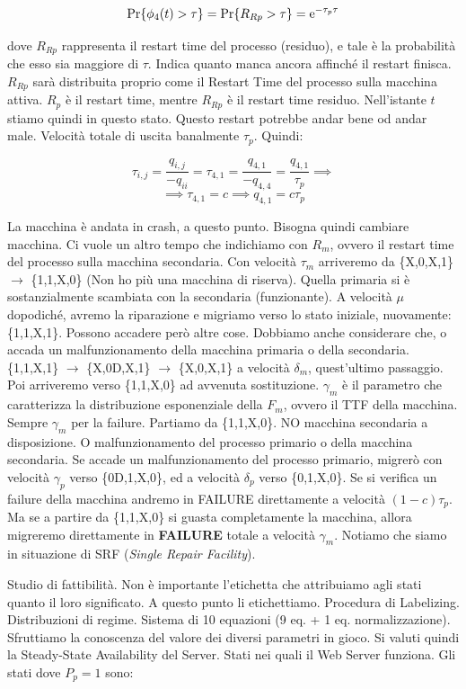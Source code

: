 \[
	\Pr\{\phi_4(t) > \tau\} = \Pr\{R_{Rp} > \tau\} = \mathop{}\!\mathrm{e}^{-\tau_p\tau}
\]

dove $R_{Rp}$ rappresenta il restart time del processo (residuo), e tale è la probabilità che esso sia maggiore di $\tau$. Indica quanto manca ancora affinché il restart finisca. $R_{Rp}$ sarà distribuita proprio come il Restart Time del processo sulla macchina attiva. $R_p$ è il restart time, mentre $R_{Rp}$ è il restart time residuo. Nell'istante $t$ stiamo quindi in questo stato. Questo restart potrebbe andar bene od andar male. Velocità totale di uscita banalmente $\tau_p$. Quindi:

\[
	\tau_{i,j} = \frac{q_{i,j}}{-q_{ii}} = \tau_{4,1} = \frac{q_{4,1}}{-q_{4,4}} = \frac{q_{4,1}}{\tau_p} \implies
\]
\[
	\implies \tau_{4,1} = c \implies q_{4,1}=c\tau_p
\]

La macchina è andata in crash, a questo punto. Bisogna quindi cambiare macchina. Ci vuole un altro tempo che indichiamo con $R_m$, ovvero il restart time del processo sulla macchina secondaria. Con velocità $\tau_m$ arriveremo da \{X,0,X,1\} $\rightarrow$ \{1,1,X,0\} (Non ho più una macchina di riserva). Quella primaria si è sostanzialmente scambiata con la secondaria (funzionante). A velocità $\mu$ dopodiché, avremo la riparazione e migriamo verso lo stato iniziale, nuovamente: \{1,1,X,1\}. Possono accadere però altre cose. Dobbiamo anche considerare che, o accada un malfunzionamento della macchina primaria o della secondaria. \{1,1,X,1\} $\rightarrow$ \{X,0D,X,1\} $\rightarrow$ \{X,0,X,1\} a velocità $\delta_m$, quest'ultimo passaggio. Poi arriveremo verso \{1,1,X,0\} ad avvenuta sostituzione. $\gamma_m$ è il parametro che caratterizza la distribuzione esponenziale della $F_m$, ovvero il TTF della macchina. Sempre $\gamma_m$ per la failure. Partiamo da \{1,1,X,0\}. NO macchina secondaria a disposizione. O malfunzionamento del processo primario o della macchina secondaria. Se accade un malfunzionamento del processo primario, migrerò con velocità $\gamma_p$ verso \{0D,1,X,0\}, ed a velocità $\delta_p$ verso \{0,1,X,0\}. Se si verifica un failure della macchina andremo in FAILURE direttamente a velocità $(1-c)\tau_p$. Ma se a partire da \{1,1,X,0\} si guasta completamente la macchina, allora migreremo direttamente in \textbf{FAILURE} totale a velocità $\gamma_m$. Notiamo che siamo in situazione di SRF (\textit{Single Repair Facility}).

Studio di fattibilità. Non è importante l'etichetta che attribuiamo agli stati quanto il loro significato. A questo punto li etichettiamo. Procedura di Labelizing. Distribuzioni di regime. Sistema di 10 equazioni (9 eq. + 1 eq. normalizzazione). Sfruttiamo la conoscenza del valore dei diversi parametri in gioco.
Si valuti quindi la Steady-State Availability del Server. Stati nei quali il Web Server funziona. Gli stati dove $P_p=1$ sono:

